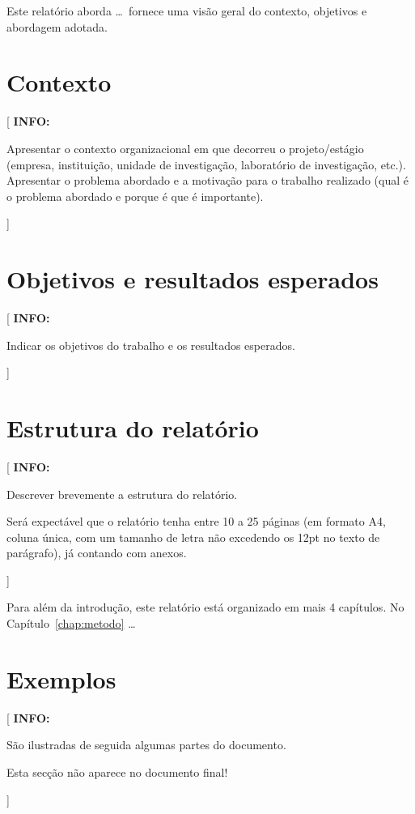 \documentclass[11pt,a4paper]{report}
\newenvironment{info}[1]{\vspace*{6mm}\color{blue}[ \textbf{INFO:} \begin{em} #1}
                        {\vspace*{3mm}\end{em} ]}
\begin{document}
Este relatório aborda \ldots\ fornece uma visão geral do contexto, objetivos e abordagem adotada.

\section{Contexto}

\begin{info}
   Apresentar o contexto organizacional em que decorreu o projeto/estágio (empresa, instituição, unidade de investigação, laboratório de investigação, etc.). 
   Apresentar o problema abordado e a motivação para o trabalho realizado (qual é o problema abordado e porque é que é importante).
\end{info}

\section{Objetivos e resultados esperados}

\begin{info}
  Indicar os objetivos do trabalho e os resultados esperados.
\end{info}

\section{Estrutura do relatório}
	
\begin{info}
  Descrever brevemente a estrutura do relatório.

  Será expectável que o relatório tenha entre 10 a 25 páginas (em formato A4, coluna única, com um tamanho de letra não excedendo os 12pt no texto de parágrafo), já contando com anexos. 
\end{info}

Para além da introdução, este relatório está organizado em mais 4 capítulos.
No Capítulo~\ref{chap:metodo} \ldots


\newpage  %
\section*{Exemplos}


\begin{info}
  São ilustradas de seguida algumas partes do documento.

  Esta secção não aparece no documento final!
\end{info}
\end{document}
